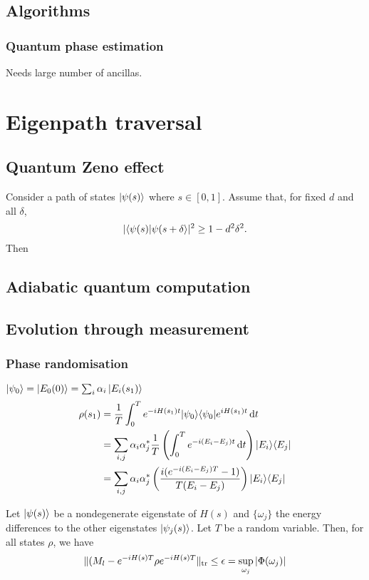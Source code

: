 \section{Algorithms}
\subsection{Quantum phase estimation}
Needs large number of ancillas.

\chapter{Eigenpath traversal}
\section{Quantum Zeno effect}
\begin{proposition}
Consider a path of states $\left| \psi(s) \right\rangle$ where $s\in[0,1]$. Assume that, for fixed $d$ and all $\delta$,
\[ |\braket{\psi(s)}{\psi(s+\delta}|^2 \geq 1-d^2\delta^2. \]
Then 
\end{proposition}

\section{Adiabatic quantum computation}
\section{Evolution through measurement}
\subsection{Phase randomisation}
$\left| \psi_0 \right\rangle = \left| E_0(0) \right\rangle = \sum_i\alpha_i\left| E_i(s_1) \right\rangle$
\begin{align*}
\rho(s_1) &= \frac{1}{T}\int_0^T e^{-iH(s_1)t}|\psi_0\rangle\langle\psi_0| e^{iH(s_1)t} \operatorname{d \!}{t} \\
&= \sum_{i,j}\alpha_i\alpha_j^* \frac{1}{T}\left(\int_0^T e^{-i(E_i-E_j)t}\operatorname{d \!}{t}\right)|E_i\rangle\langle E_j| \\
&= \sum_{i,j}\alpha_i\alpha_j^* \left(\frac{i(e^{-i(E_i-E_j)T}-1)}{T(E_i-E_j)}\right)|E_i\rangle\langle E_j|
\end{align*}

\begin{theorem}
Let $\left| \psi(s) \right\rangle$ be a nondegenerate eigenstate of $H(s)$ and $\{\omega_j\}$ the energy differences to the other eigenstates $\left| \psi_j(s) \right\rangle$. Let $T$ be a random variable. Then, for all states $\rho$, we have
\[ \lVert(M_l - e^{-iH(s)T}\rho e^{-iH(s)T}\rVert_\text{tr} \leq \epsilon = \sup_{\omega_j}|\Phi(\omega_j)| \]
\end{theorem}

